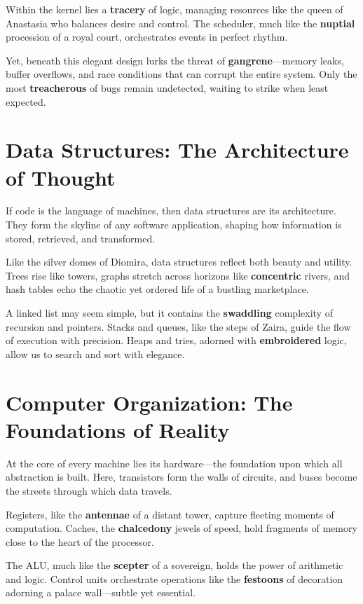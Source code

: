 \documentclass[12pt]{article}
\begin{document}
	Within the kernel lies a \textbf{tracery} of logic, managing resources like the queen of Anastasia who balances desire and control. The scheduler, much like the \textbf{nuptial} procession of a royal court, orchestrates events in perfect rhythm.
	
	Yet, beneath this elegant design lurks the threat of \textbf{gangrene}—memory leaks, buffer overflows, and race conditions that can corrupt the entire system. Only the most \textbf{treacherous} of bugs remain undetected, waiting to strike when least expected.
	
	\section{Data Structures: The Architecture of Thought}
	If code is the language of machines, then data structures are its architecture. They form the skyline of any software application, shaping how information is stored, retrieved, and transformed.
	
	Like the silver domes of Diomira, data structures reflect both beauty and utility. Trees rise like towers, graphs stretch across horizons like \textbf{concentric} rivers, and hash tables echo the chaotic yet ordered life of a bustling marketplace.
	
	A linked list may seem simple, but it contains the \textbf{swaddling} complexity of recursion and pointers. Stacks and queues, like the steps of Zaira, guide the flow of execution with precision. Heaps and tries, adorned with \textbf{embroidered} logic, allow us to search and sort with elegance.
	
	\section{Computer Organization: The Foundations of Reality}
	At the core of every machine lies its hardware—the foundation upon which all abstraction is built. Here, transistors form the walls of circuits, and buses become the streets through which data travels.
	
	Registers, like the \textbf{antennae} of a distant tower, capture fleeting moments of computation. Caches, the \textbf{chalcedony} jewels of speed, hold fragments of memory close to the heart of the processor.
	
	The ALU, much like the \textbf{scepter} of a sovereign, holds the power of arithmetic and logic. Control units orchestrate operations like the \textbf{festoons} of decoration adorning a palace wall—subtle yet essential.
	
\end{document}
